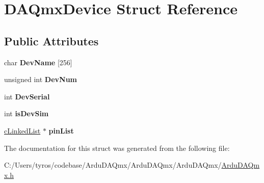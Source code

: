 \hypertarget{struct_d_a_qmx_device}{}\section{D\+A\+Qmx\+Device Struct Reference}
\label{struct_d_a_qmx_device}
\subsection*{Public Attributes}
\begin{DoxyCompactItemize}
\item 
\mbox{\label{struct_d_a_qmx_device_adba2c780d9ec282be39523bfe21f96a7}} 
char {\bfseries Dev\+Name} \mbox{[}256\mbox{]}
\item 
\mbox{\label{struct_d_a_qmx_device_a297cf2f2e79d47e67353b553351e79aa}} 
unsigned int {\bfseries Dev\+Num}
\item 
\mbox{\label{struct_d_a_qmx_device_af76a0d98a8b47eda2aba51fba33da147}} 
int {\bfseries Dev\+Serial}
\item 
\mbox{\label{struct_d_a_qmx_device_a27c7b25db245ca2d5bf91c28ac37f08c}} 
int {\bfseries is\+Dev\+Sim}
\item 
\mbox{\label{struct_d_a_qmx_device_a23df66a3e413397d12503b0c06eddb21}} 
\mbox{\hyperlink{structc_linked_list_t_a_g}{c\+Linked\+List}} $\ast$ {\bfseries pin\+List}
\end{DoxyCompactItemize}


The documentation for this struct was generated from the following file\+:\begin{DoxyCompactItemize}
\item 
C\+:/\+Users/tyros/codebase/\+Ardu\+D\+A\+Qmx/\+Ardu\+D\+A\+Qmx/\+Ardu\+D\+A\+Qmx/\mbox{\hyperlink{_ardu_d_a_qmx_8h}{Ardu\+D\+A\+Qmx.\+h}}\end{DoxyCompactItemize}
